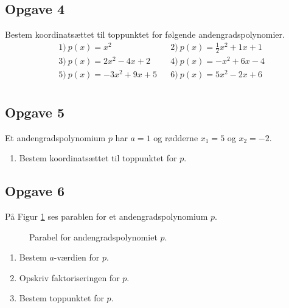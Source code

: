 \subsection*{Opgave 4}
Bestem koordinatsættet til toppunktet for følgende andengradspolynomier.
\begin{align*}
	&1) \ p(x) = x^2 &  &2) \ p(x) = \frac{1}{2}x^2 + 1x + 1 \\
	&3) \ p(x) = 2x^2 - 4x + 2 &  &4) \ p(x) = -x^2 + 6x - 4 \\
	&5) \ p(x) = -3x^2 + 9x + 5 &  &6) \ p(x) = 5x^2 -2x + 6 \\
\end{align*}

\subsection*{Opgave 5}
Et andengradspolynomium $p$ har $a = 1$ og rødderne $x_1 = 5$ og $x_2 = -2$.
\begin{enumerate}[label=\roman*)]
	\item Bestem koordinatsættet til toppunktet for $p$.
\end{enumerate}  

\subsection*{Opgave 6}
På Figur \ref{fig:toppunktopgave} ses parablen for et andengradspolynomium $p$. 
\begin{figure}[H]
	\centering
	\caption{Parabel for andengradspolynomiet $p$.}
	\label{fig:toppunktopgave}
\end{figure}
\begin{enumerate}[label=\roman*)]
	\item Bestem $a$-værdien for $p$. 
	\item Opskriv faktoriseringen for $p$. 
	\item Bestem toppunktet for $p$. 
\end{enumerate}

